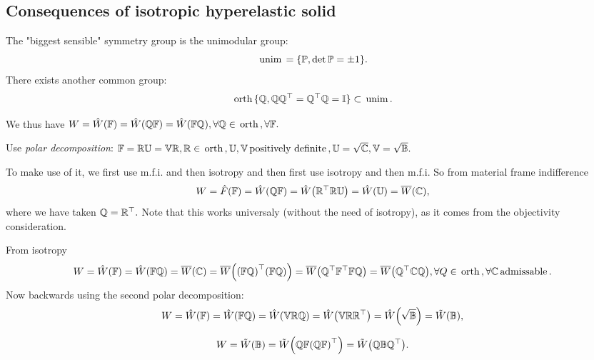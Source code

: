 \documentclass[reqno, a4paper]{article}
\begin{document}
\subsection{Consequences of isotropic hyperelastic solid}
\label{sec:conshypelisosolid}

\begin{remark}
	The "biggest sensible" symmetry group is the unimodular group:
	\[
		\, \text{unim} \, = \{\mathbb{P}, \det \mathbb{P} = \pm 1\}.
	\]
	There exists another common group:
	\[
		\, \text{orth} \, \{ \mathbb{Q}, \mathbb{Q}\mathbb{Q}^\top = \mathbb{Q}^\top \mathbb{Q} = \mathbb{I}\} \subset \, \text{unim} \,.
	\]
\end{remark}
We thus have $W = \hat{W}\qty(\mathbb{F}) = \hat{W}\qty(\mathbb{Q}\mathbb{F}) = \hat{W}\qty(\mathbb{F} \mathbb{Q}), \forall \mathbb{Q} \in \, \text{orth} \,, \forall \mathbb{F}.$

Use \textit{polar decomposition}: $\mathbb{F} = \mathbb{R}\mathbb{U} = \mathbb{V}\mathbb{R}, \mathbb{R} \in \, \text{orth} \,, \mathbb{U,V} \, \text{positively definite} \,, \mathbb{U} = \sqrt{\mathbb{C}}, \mathbb{V} = \sqrt{\mathbb{B}}.$ 

To make use of it, we first use m.f.i. and then isotropy and then first use isotropy and then m.f.i.
So from material frame indifference
\[
	W = \hat{F}\qty(\mathbb{F}) = \hat{W}\qty(\mathbb{Q}\mathbb{F}) = \hat{W}\qty(\mathbb{R}^\top \mathbb{R} \mathbb{U}) = \hat{W}\qty(\mathbb{U}) = \overline{W}\qty(\mathbb{C}),
\]
where we have taken $\mathbb{Q} = \mathbb{R}^\top.$ Note that this works universaly (without the need of isotropy), as it comes from the objectivity consideration.

From isotropy
\[
	W = \hat{W}\qty(\mathbb{F}) = \hat{W}\qty(\mathbb{F} \mathbb{Q}) = \overline{W}\qty(\mathbb{C}) = \overline{W}\qty(\qty(\mathbb{F} \mathbb{Q})^\top \qty(\mathbb{F} \mathbb{Q})) = \overline{W}\qty(\mathbb{Q}^\top \mathbb{F}^\top\mathbb{F} \mathbb{Q}) = \overline{W}\qty(\mathbb{Q}^\top\mathbb{C} \mathbb{Q}), \forall Q \in \, \text{orth} \,, \forall \mathbb{C} \, \text{admissable} \,.
\]
Now backwards using the second polar decomposition:
\[
	W = \hat{W}\qty(\mathbb{F}) = \hat{W}\qty(\mathbb{F} \mathbb{Q}) = \hat{W}\qty(\mathbb{V}\mathbb{R}\mathbb{Q}) = \hat{W}\qty(\mathbb{V}\mathbb{R}\mathbb{R}^\top) = \hat{W}\qty(\sqrt{\mathbb{B}}) = \tilde{W}\qty(\mathbb{B}),
\]

\[
	W = \tilde{W}\qty(\mathbb{B}) = \tilde{W}\qty(\mathbb{Q}\mathbb{F} \qty(\mathbb{Q}\mathbb{F})^\top) = \tilde{W}\qty(\mathbb{Q}\mathbb{B} \mathbb{Q}^\top).
\]
\end{document}
